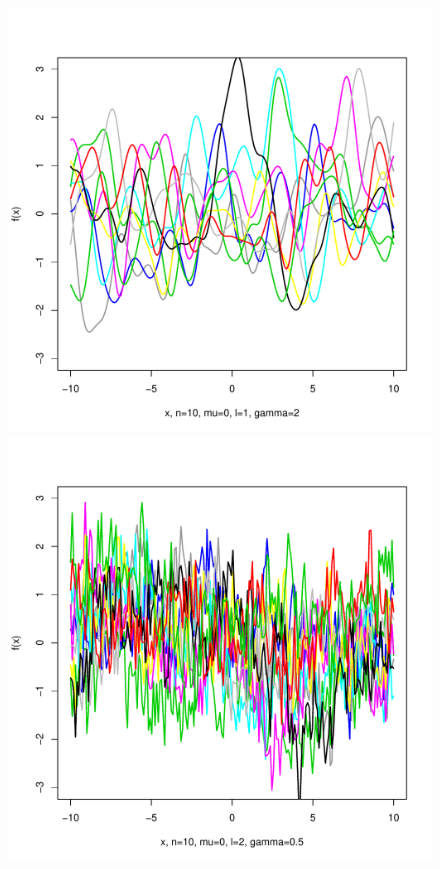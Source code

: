 \documentclass[12pt,letterpaper]{article}
\begin{document}
\begin{figure}
\begin{center}
\includegraphics[scale=0.2]{hw321/n10-m0-l1-g4.pdf}
\includegraphics[scale=0.2]{hw321/n10-m0-l2-g1.pdf}

\end{center}
\end{figure}
\end{document}
